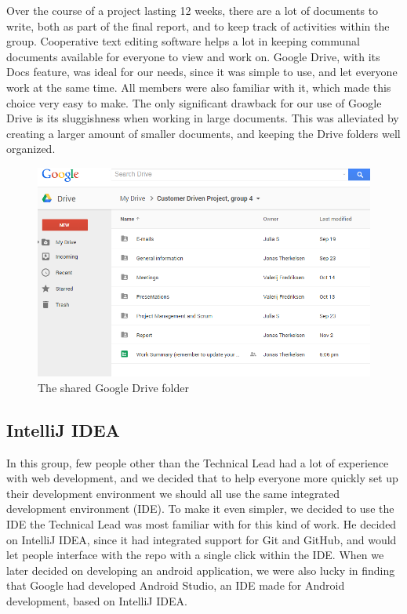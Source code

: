 Over the course of a project lasting 12 weeks, there are a lot of documents to write, both as part of the final report, and to keep track of activities within the group. Cooperative text editing software helps a lot in keeping communal documents available for everyone to view and work on. Google Drive, with its Docs feature, was ideal for our needs, since it was simple to use, and let everyone work at the same time. All members were also familiar with it, which made this choice very easy to make. The only significant drawback for our use of Google Drive is its sluggishness when working in large documents. This was alleviated by creating a larger amount of smaller documents, and keeping the Drive folders well organized.

\begin{figure}[ht!]
  \centering
  \includegraphics[width=\linewidth]{./Planning/img/Drive}
  \caption{The shared Google Drive folder}
  \label{fig:PlanningSoftwareDevDriveFolder}
\end{figure}


\subsection{IntelliJ IDEA}
\label{subsec:PlanningSoftwareDevIntelliJ}

In this group, few people other than the Technical Lead had a lot of experience with web development, and we decided that to help everyone more quickly set up their development environment we should all use the same integrated development environment (IDE). To make it even simpler, we decided to use the IDE the Technical Lead was most familiar with for this kind of work. He decided on IntelliJ IDEA, since it had integrated support for Git and GitHub, and would let people interface with the repo with a single click within the IDE. When we later decided on developing an android application, we were also lucky in finding that Google had developed Android Studio, an IDE made for Android development, based on IntelliJ IDEA.


